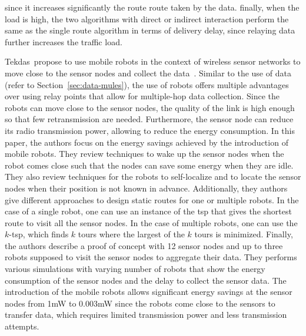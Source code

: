 since it increases significantly the route route taken by the data. finally, when the load is high, the two algorithms with direct or indirect interaction perform the same as the single route algorithm in terms of delivery delay, since relaying data further increases the traffic load.

Tekdas~\etal propose to use mobile robots in the context of wireless sensor networks to move close to the sensor nodes and collect the data~\cite{tekdas2009using}. Similar to the use of data  (refer to Section~\ref{sec:data-mules}), the use of robots offers multiple advantages over using relay points that allow for multiple-hop data collection. Since the robots can move close to the sensor nodes, the quality of the link is high enough so that few retransmission are needed. Furthermore, the sensor node can reduce its radio transmission power, allowing to reduce the energy consumption. In this paper, the authors focus on the energy savings achieved by the introduction of mobile robots. They review techniques to wake up the sensor nodes when the robot comes close such that the nodes can save some energy when they are idle. They also review techniques for the robots to self-localize and to locate the sensor nodes when their position is not known in advance. Additionally, they authors give different approaches to design static routes for one or multiple robots. In the case of a single robot, one can use an instance of the \acrshort{tsp} that gives the shortest route to visit all the sensor nodes. In the case of multiple robots, one can use the $k$-\acrshort{tsp}, which finds $k$ tours where the largest of the $k$ tours is minimized. Finally, the authors describe a proof of concept with 12 sensor nodes and up to three robots supposed to visit the sensor nodes to aggregate their data. They performs various simulations with varying number of robots that show the energy consumption of the sensor nodes and the delay to collect the sensor data. The introduction of the mobile robots allows significant energy savings at the sensor nodes from 1mW to 0.003mW since the robots come close to the sensors to transfer data, which requires limited transmission power and less transmission attempts.

